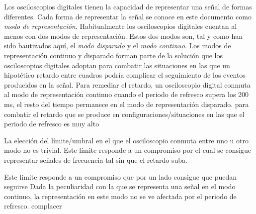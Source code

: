 Los osciloscopios digitales tienen la capacidad de representar una señal de formas diferentes. Cada forma de representar la señal se conoce en este documento como \emph{modo de representación}. Habitualmente los osciloscopios digitales cuentan al menos con dos modos de representación. Estos dos modos son, tal y como han sido bautizados aquí, el \emph{modo disparado} y el \emph{modo continuo}. Los modos de representación continuo y disparado forman parte de la solución que los osciloscopios digitales adoptan para combatir las situaciones en las que un hipotético retardo entre cuadros podría complicar el seguimiento de los eventos producidos en la señal. Para remediar el retardo, un osciloscopio digital conmuta al modo de representación continuo cuando el periodo de refresco supera los 200 ms, el resto del tiempo permanece en el modo de representación disparado.
para combatir el retardo que se produce en configuraciones/situaciones en las que el periodo de refresco es muy alto

La elección del límite/umbral en el que el osciloscopio conmuta entre uno u otro modo no es trivial. Este límite responde a un compromiso 
por el cual se consigue representar señales de frecuencia tal sin que el retardo suba.

Este límite responde a un compromiso 
que por un lado consigue que puedan seguirse 
Dada la peculiaridad con la que se representa una señal en el modo continuo, la representación en este modo no se ve afectada por el periodo de refresco.
complacer


